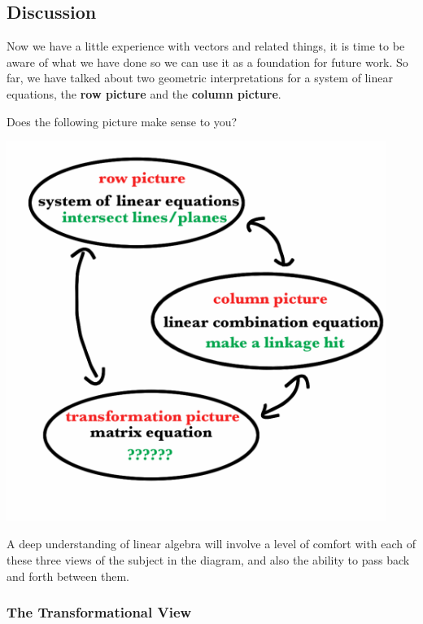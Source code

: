 \documentclass[10pt,]{book}
\newcommand{\terminology}[1]{\textbf{#1}}
\theoremstyle{plain}
\numberwithin{equation}{section}
\renewenvironment{figure}%
{\begin{mbxfigure}\setcounter{mbxfigure}{\value{theorem}}\stepcounter{theorem}}%
{\end{mbxfigure}}
\begin{document}
\subsection[Discussion]{Discussion}\label{subsection-21}

      Now we have a little experience with vectors and related things, it is
      time to be aware of what we have done so we can use it as a foundation for
      future work. So far, we have talked about two geometric interpretations
      for a system of linear equations, the \terminology{row picture} and the
      \terminology{column picture}.
\par

      Does the following picture make sense to you?
\begin{figure}
\centering
\includegraphics[width=350pt,]{images/ThreePics.png}\caption{The three geometric models of linear algebra\label{figure-1}}
\end{figure}
\par

      A deep understanding of linear algebra will involve a level of comfort with
      each of these three views of the subject in the diagram, and also the ability
      to pass back and forth between them.
\typeout{************************************************}
\typeout{************************************************}
\subsubsection[The Transformational View]{The Transformational View}\label{subsubsection-10}
\end{document}
